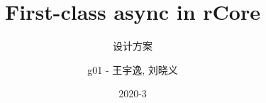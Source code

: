 \documentclass[UTF-8]{ctexbeamer}
\title{First-class async in rCore}
\subtitle{设计方案}
\author{g01 - 王宇逸, 刘晓义}
\date{2020-3}
\begin{document}
\begin{frame}
  \titlepage
\end{frame}
  
\end{document}
